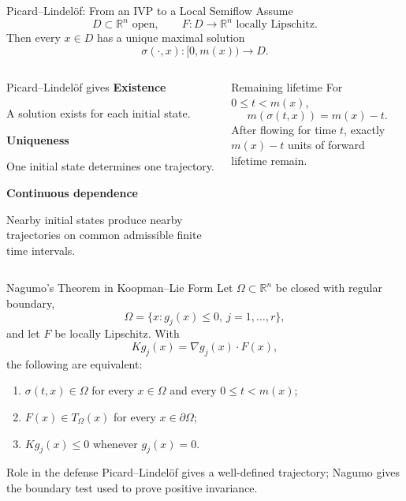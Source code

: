 \documentclass[aspectratio=169,11pt]{beamer}
\newcommand{\R}{\mathbb{R}}
\newcommand{\mstop}{m}
\newcommand{\flow}{\sigma}
\begin{document}
\begin{frame}{Picard--Lindel\"of: From an IVP to a Local Semiflow}
\small
Assume
\[
D\subset\R^n\text{ open},
\qquad
F:D\to\R^n\text{ locally Lipschitz}.
\]
Then every \(x\in D\) has a unique maximal solution
\[
\flow(\cdot,x):[0,\mstop(x))\to D.
\]

\begin{columns}[T,onlytextwidth]
\begin{block}{Picard--Lindel\"of gives}
\footnotesize
\textbf{Existence}\par
A solution exists for each initial state.\par\vspace{0.4em}
\textbf{Uniqueness}\par
One initial state determines one trajectory.\par\vspace{0.4em}
\textbf{Continuous dependence}\par
Nearby initial states produce nearby trajectories on common admissible finite time intervals.
\end{block}

\begin{alertblock}{Remaining lifetime}
For \(0\le t<\mstop(x)\),
\[
\boxed{\mstop(\flow(t,x))=\mstop(x)-t.}
\]
After flowing for time \(t\), exactly \(m(x)-t\) units of forward lifetime remain.
\end{alertblock}
\end{columns}
\end{frame}

\begin{frame}{Nagumo's Theorem in Koopman--Lie Form}
\footnotesize
Let \(\Omega\subset\R^n\) be closed with regular boundary,
\[
\Omega=\{x:g_j(x)\le0,\ j=1,\dots,r\},
\]
and let \(F\) be locally Lipschitz. With
\[
Kg_j(x)=\nabla g_j(x)\cdot F(x),
\]
the following are equivalent:
\begin{enumerate}
  \item \(\flow(t,x)\in\Omega\) for every \(x\in\Omega\) and every \(0\le t<\mstop(x)\);
  \item \(F(x)\in T_\Omega(x)\) for every \(x\in\partial\Omega\);
  \item \(Kg_j(x)\le0\) whenever \(g_j(x)=0\).
\end{enumerate}

\begin{alertblock}{Role in the defense}
Picard--Lindel\"of gives a well-defined trajectory; Nagumo gives the boundary test used to prove positive invariance.
\end{alertblock}
\end{frame}
\end{document}
